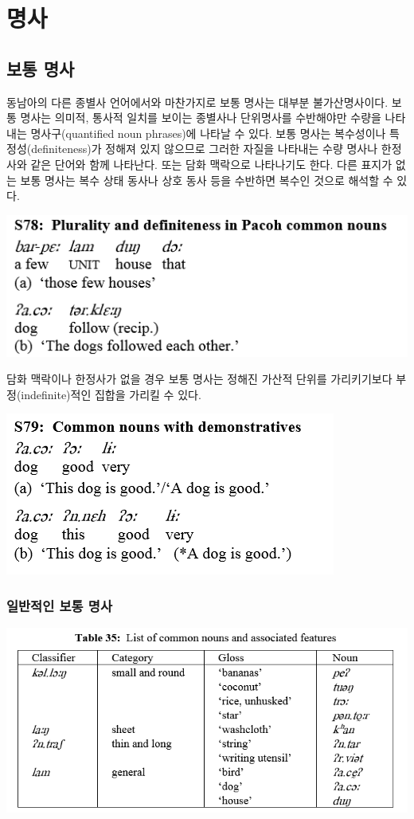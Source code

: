 \section{명사}
\subsection{보통 명사}
동남아의 다른 종별사 언어에서와 마찬가지로 보통 명사는 대부분 불가산명사이다. 보통 명사는 의미적, 통사적 일치를 보이는 종별사나 단위명사를 수반해야만 수량을 나타내는 명사구(quantified noun phrases)에 나타날 수 있다.
보통 명사는 복수성이나 특정성(definiteness)가 정해져 있지 않으므로 그러한 자질을 나타내는 수량 명사나 한정사와 같은 단어와 함께 나타난다. 또는 담화 맥락으로 나타나기도 한다. 다른 표지가 없는 보통 명사는 복수 상태 동사나 상호 동사 등을 수반하면 복수인 것으로 해석할 수 있다.

\includegraphics{Pacoh/src/PacohS78.png}

담화 맥락이나 한정사가 없을 경우 보통 명사는 정해진 가산적 단위를 가리키기보다 부정(indefinite)적인 집합을 가리킬 수 있다.

\includegraphics{Pacoh/src/PacohS79.png}

\subsubsection{일반적인 보통 명사}

\includegraphics{Pacoh/src/PacohTable35.png}

